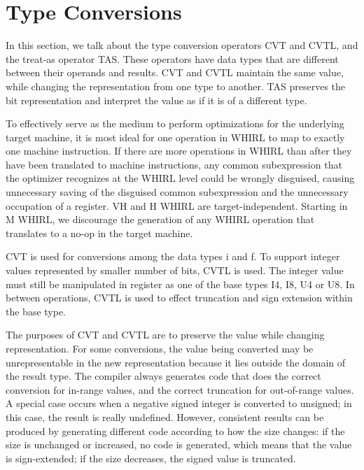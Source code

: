 \documentclass{article}
\begin{document}
\section{Type Conversions}

In this section, we talk about the type conversion operators
%
CVT
and
%
CVTL, and the treat-as operator TAS. These operators have data
types that are different between their operands and results.
%
CVT and
%
CVTL maintain the same value, while changing the representation
from one type to another. TAS preserves the bit representation and
interpret the value as if it is of a different type.

To effectively serve as the medium to perform optimizations for
the underlying target machine, it is most ideal for one operation
in WHIRL to map to exactly one machine instruction. If there are
more operations in WHIRL than after they have been translated to
machine instructions, any common subexpression that the optimizer
recognizes at the WHIRL level could be wrongly disguised, causing
unnecessary saving of the disguised common subexpression and the
unnecessary occupation of a register. VH and H WHIRL are
target-independent. Starting in M WHIRL, we discourage the generation
of any WHIRL operation that translates to a no-op in the target
machine.

%
CVT is used for conversions among the data types i and f. To support
integer values represented by smaller number of bits,
%
CVTL is used. The integer value must still be manipulated in
register as one of the base types I4,
I8, U4 or U8. In between operations,
%
CVTL is used to effect
truncation and sign extension within the base type.

The purposes of
%
CVT and
%
CVTL are to preserve the value while
changing representation. For some conversions, the value being
converted may be unrepresentable in the new representation because
it lies outside the domain of the result type. The compiler always
generates code that does the correct conversion for in-range values,
and the correct truncation for out-of-range values. A special case
occurs when a negative signed integer is converted to unsigned; in
this case, the result is really undefined. However, consistent
results can be produced by generating different code according to
how the size changes: if the size is unchanged or increased, no code
is generated, which means that the value is sign-extended; if the
size decreases, the signed value is truncated.
\end{document}
